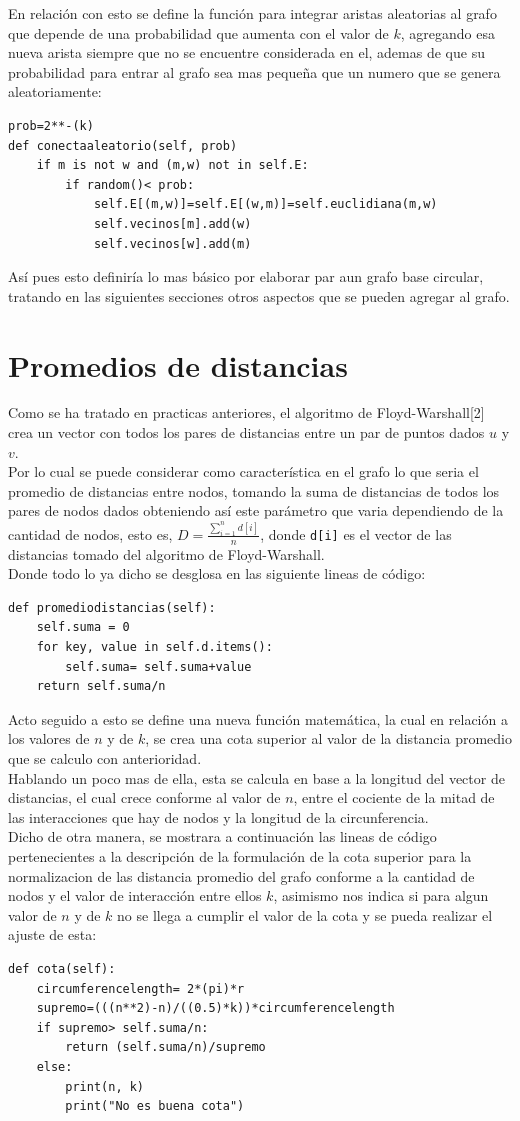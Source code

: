 \documentclass[12pt]{article}
\begin{document}
En relación con esto se define la función para integrar aristas aleatorias al grafo que depende de una probabilidad que aumenta con el valor de $k$, agregando esa nueva arista siempre que no se encuentre considerada en el, ademas de que su probabilidad para entrar al grafo sea mas pequeña que un numero que se genera aleatoriamente:
\begin{lstlisting}[style=tt]
prob=2**-(k)
def conectaaleatorio(self, prob)
	if m is not w and (m,w) not in self.E:
		if random()< prob:
			self.E[(m,w)]=self.E[(w,m)]=self.euclidiana(m,w)
			self.vecinos[m].add(w)
			self.vecinos[w].add(m)
\end{lstlisting}
Así pues esto definiría lo mas básico por elaborar par aun grafo base circular, tratando en las siguientes secciones otros aspectos que se pueden agregar al grafo.
\section{Promedios de distancias}
Como se ha tratado en practicas anteriores, el algoritmo de Floyd-Warshall[2] crea un vector con todos los pares de distancias entre un par de puntos dados $u$ y $v$.\\
Por lo cual se puede considerar como característica en el grafo lo que seria el promedio de distancias entre nodos, tomando la suma de distancias de todos los pares de nodos dados obteniendo así este parámetro que varia dependiendo de la cantidad de nodos, esto es, $D= \frac{\sum_{i=1}^n d[i]}{n}$, donde \texttt{d[i]} es el vector de las distancias tomado del algoritmo de Floyd-Warshall.\\ Donde todo lo ya dicho se desglosa en las siguiente lineas de código:
\begin{lstlisting}[style=tt]
def promediodistancias(self):
	self.suma = 0
	for key, value in self.d.items():
		self.suma= self.suma+value
	return self.suma/n
\end{lstlisting}
Acto seguido a esto se define una nueva función matemática, la cual en relación a los valores de $n$ y de $k$, se crea una cota superior al valor de la distancia promedio que se calculo con anterioridad.\\
Hablando un poco mas de ella, esta se calcula en base a la longitud del vector de distancias, el cual crece conforme al valor de $n$, entre el cociente de la mitad de las interacciones que hay de nodos y la longitud de la circunferencia.\\Dicho de otra manera, se mostrara a continuación las lineas de código pertenecientes a la descripción de la formulación de la cota superior para la normalizacion de las distancia promedio del grafo conforme a la cantidad de nodos y el valor de interacción entre ellos $k$, asimismo nos indica si para algun valor de $n$ y de $k$ no se llega a cumplir el valor de la cota y se pueda realizar el ajuste de esta:
\begin{lstlisting}[style=tt]
def cota(self):
	circumferencelength= 2*(pi)*r
	supremo=(((n**2)-n)/((0.5)*k))*circumferencelength
	if supremo> self.suma/n:
		return (self.suma/n)/supremo
	else:
		print(n, k)
		print("No es buena cota")
\end{lstlisting}
\end{document}
